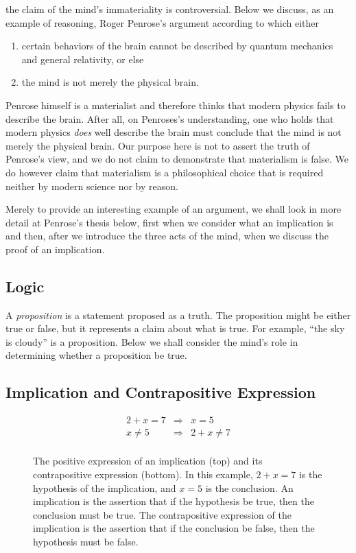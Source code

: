 the claim of the mind's immateriality is controversial.  Below we discuss, as
an example of reasoning, Roger Penrose's argument according to which either
\begin{enumerate}
   \item certain behaviors of the brain cannot be described by quantum
      mechanics and general relativity, or else
   \item the mind is not merely the physical brain.
\end{enumerate}
Penrose himself is a materialist and therefore thinks that modern physics fails
to describe the brain. After all, on Penroses's understanding, one who holds
that modern physics \emph{does} well describe the brain must conclude that the
mind is not merely the physical brain. Our purpose here is not to assert the
truth of Penrose's view, and we do not claim to demonstrate that materialism is
false. We do however claim that materialism is a philosophical choice that is
required neither by modern science nor by reason.

Merely to provide an interesting example of an argument, we shall look in more
detail at Penrose's thesis below, first when we consider what an implication is
and then, after we introduce the three acts of the mind, when we discuss the
proof of an implication.

\subsection{Logic}

A \emph{proposition} is a statement proposed as a truth. The proposition might
be either true or false, but it represents a claim about what is true. For
example, ``the sky is cloudy'' is a proposition. Below we shall consider the
mind's role in determining whether a proposition be true.

\subsection{Implication and Contrapositive Expression}

\begin{figure}
   \begin{center}
      \begin{framed}
         \begin{eqnarray*}
            2 + x = 7 &\Rightarrow& x = 5\\
            x \neq 5  &\Rightarrow& 2 + x \neq 7\\
         \end{eqnarray*}
      \end{framed}
   \end{center}
   \caption{The positive expression of an implication (top) and its
      contrapositive expression (bottom). In this example, $2 + x = 7$ is the
      hypothesis of the implication, and $x = 5$ is the conclusion. An
      implication is the assertion that if the hypothesis be true, then the
      conclusion must be true. The contrapositive expression of the implication
      is the assertion that if the conclusion be false, then the hypothesis
      must be false.
   }
\label{fig:contrapositive}
\end{figure}

